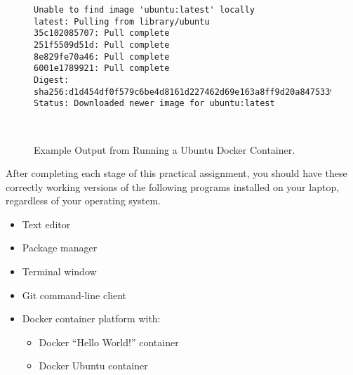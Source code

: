 \documentclass[11pt]{article}
\begin{document}
\begin{figure}

\begin{verbatim}
Unable to find image 'ubuntu:latest' locally
latest: Pulling from library/ubuntu
35c102085707: Pull complete
251f5509d51d: Pull complete
8e829fe70a46: Pull complete
6001e1789921: Pull complete
Digest: sha256:d1d454df0f579c6be4d8161d227462d69e163a8ff9d20a847533989cf0c94d90
Status: Downloaded newer image for ubuntu:latest
\end{verbatim}

\vspace*{-.25in}
\caption{Example Output from Running a Ubuntu Docker Container.}~\label{fig:ubuntu}
\vspace*{-.25in}
\end{figure}

\vspace*{-.05in}

After completing each stage of this practical assignment, you should have these
correctly working versions of the following programs installed on your laptop,
regardless of your operating system.

\vspace*{-.05in}

\begin{itemize}
  \setlength{\itemsep}{0pt}

  \item Text editor

  \item Package manager

  \item Terminal window

  \item Git command-line client

  \item Docker container platform with:

    \vspace*{-.1in}
    \begin{itemize}
      \setlength{\itemsep}{0pt}

      \item Docker ``Hello World!'' container
      \item Docker Ubuntu container

    \end{itemize}

\end{itemize}

\vspace*{-.1in}
\end{document}
